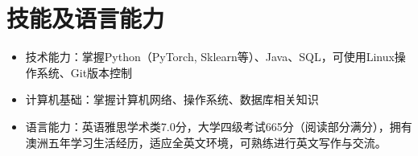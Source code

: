 \documentclass[UTF8,letterpaper,11pt]{article}
\begin{document}

\section{\textbf{技能及语言能力}}

\begin{itemize}
  \setlength\itemsep{2pt}
  \item 技术能力：掌握Python（PyTorch, Sklearn等）、Java、SQL，可使用Linux操作系统、Git版本控制
  \item 计算机基础：掌握计算机网络、操作系统、数据库相关知识
  \item 语言能力：英语雅思学术类7.0分，大学四级考试665分（阅读部分满分），拥有澳洲五年学习生活经历，适应全英文环境，可熟练进行英文写作与交流。
\end{itemize}


\end{document}
